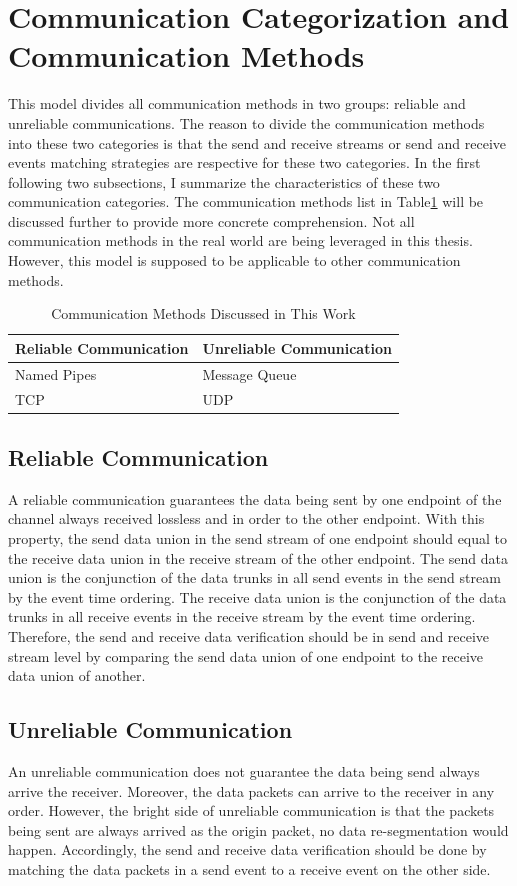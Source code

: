 \section{Communication Categorization and Communication Methods}
This model divides all communication methods in two groups: reliable and unreliable communications. The reason to divide the communication methods into these two categories is that the send and receive streams or send and receive events matching strategies are respective for these two categories. In the first following two subsections, I summarize the characteristics of these two communication categories. The communication methods list in Table\ref{methodsInCategories} will be discussed further to provide more concrete comprehension. Not all communication methods in the real world are being leveraged in this thesis. However, this model is supposed to be applicable to other communication methods.
\begin{table}[H]
\centering
\caption{Communication Methods Discussed in This Work}
\label{methodsInCategories}
\begin{tabular}{|l|l|}
 \hline
\textbf{Reliable Communication}& \textbf{Unreliable Communication}\\
 \hline
Named Pipes & Message Queue   \\
TCP &  UDP \\
 \hline
\end{tabular}
\end{table}


\subsection{Reliable Communication}   
A reliable communication guarantees the data being sent by one endpoint of the channel always received lossless and in order to the other endpoint. With this property, the send data union in the send stream of one endpoint should equal to the receive data union in the receive stream of the other endpoint. The send data union is the conjunction of the data trunks in all send events in the send stream by the event time ordering. The receive data union is the conjunction of the data trunks in all receive events in the receive stream by the event time ordering. Therefore, the send and receive data verification should be in send and receive stream level by comparing the send data union of one endpoint to the receive data union of another.

\subsection{Unreliable Communication}
An unreliable communication does not guarantee the data being send always arrive the receiver. Moreover, the data packets can arrive to the receiver in any order. However, the bright side of unreliable communication is that the packets being sent are always arrived as the origin packet, no data re-segmentation would happen. Accordingly, the send and receive data verification should be done by matching the data packets in a send event to a receive event on the other side.

